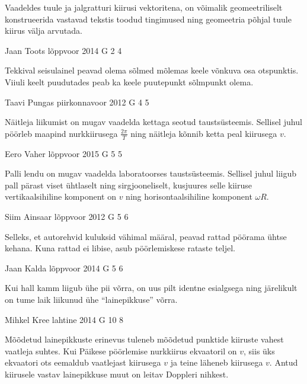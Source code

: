 \documentclass[11pt]{article}
\begin{document}
{{\ifHint
Vaadeldes tuule ja jalgratturi kiirusi vektoritena, on võimalik geomeetriliselt konstrueerida vastavad tekstis toodud tingimused ning geomeetria põhjal tuule kiirus välja arvutada.
\fi
}

{Jaan Toots} %
{lõppvoor} %
{2014} %
{G 2} %
{4} %
{

\ifHint
Tekkival seisulainel peavad olema sõlmed mõlemas keele võnkuva osa otspunktis. Viiuli keelt puudutades peab ka keele puutepunkt sõlmpunkt olema.
\fi
}

{Taavi Pungas} %
{piirkonnavoor} %
{2012} %
{G 4} %
{5} %
{

\ifHint
Näitleja liikumist on mugav vaadelda kettaga seotud taustsüsteemis. Sellisel juhul pöörleb maapind nurkkiirusega $\frac{2\pi}{T}$ ning näitleja kõnnib ketta peal kiirusega $v$.
\fi
}

{Eero Vaher} %
{lõppvoor} %
{2015} %
{G 5} %
{5} %
{

\ifHint
Palli lendu on mugav vaadelda laboratoorses taustsüsteemis. Sellisel juhul liigub pall pärast viset ühtlaselt ning sirgjooneliselt, kusjuures selle kiiruse vertikaalsihiline komponent on $v$ ning horisontaalsihiline komponent $\omega R$.
\fi
}

{Siim Ainsaar} %
{lõppvoor} %
{2012} %
{G 5} %
{6} %
{

\ifHint
Selleks, et autorehvid kuluksid vähimal määral, peavad rattad pöörama ühtse kehana. Kuna rattad ei libise, asub pöörlemiskese rataste teljel.
\fi
}

{Jaan Kalda} %
{lõppvoor} %
{2014} %
{G 5} %
{6} %
{

\ifHint
Kui hall kamm liigub ühe pii võrra, on uus pilt identne esialgsega ning järelikult on tume laik liikunud ühe \enquote{lainepikkuse} võrra.
\fi
}

{Mihkel Kree} %
{lahtine} %
{2014} %
{G 10} %
{8} %
{

\ifHint
Mõõdetud lainepikkuste erinevus tuleneb mõõdetud punktide kiiruste vahest vaatleja suhtes. Kui Päikese pöörlemise nurkkiirus ekvaatoril on $v$, siis üks ekvaatori ots eemaldub vaatlejast kiirusega $v$ ja teine läheneb kiirusega $v$. Antud kiirusele vastav lainepikkuse muut on leitav Doppleri nihkest.
\fi
}

}
\end{document}
